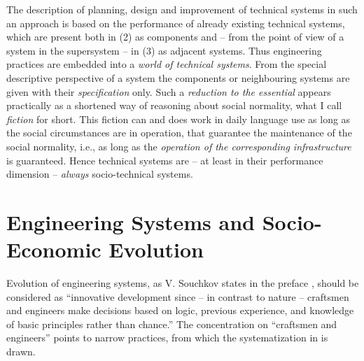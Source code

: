 \documentclass[11pt,a4paper]{article}
\begin{document}
The description of planning, design and improvement of technical systems in
such an approach is based on the performance of already existing technical
systems, which are present both in (2) as components and -- from the point of
view of a system in the supersystem -- in (3) as adjacent systems.  Thus
engineering practices are embedded into a \emph{world of technical systems}.
From the special descriptive perspective of a system the components or
neighbouring systems are given with their \emph{specification} only. Such a
\emph{reduction to the essential} appears practically as a shortened way of
reasoning about social normality, what I call \emph{fiction} for short. This
fiction can and does work in daily language use as long as the social
circumstances are in operation, that guarantee the maintenance of the social
normality, i.e., as long as the \emph{operation of the corresponding
  infrastructure} is guaranteed.  Hence technical systems are -- at least in
their performance dimension -- \emph{always} socio-technical systems.

\section{Engineering Systems and Socio-Economic Evolution}

Evolution of engineering systems, as V. Souchkov states in the preface
\cite[p. IX]{TESE2018}, should be considered as ``innovative development since
-- in contrast to nature -- craftsmen and engineers make decisions based on
logic, previous experience, and knowledge of basic principles rather than
chance.'' The concentration on ``craftsmen and engineers'' points to narrow
practices, from which the systematization in \cite{TESE2018} is drawn.
\end{document}

